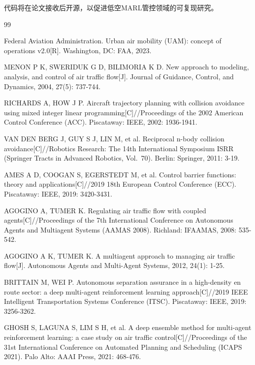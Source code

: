 \documentclass[12pt,a4paper,UTF8]{ctexart}
\begin{document}
代码将在论文接收后开源，以促进低空MARL管控领域的可复现研究。

\begin{thebibliography}{99}

 Federal Aviation Administration. Urban air mobility (UAM): concept of operations v2.0[R]. Washington, DC: FAA, 2023.

 MENON P K, SWERIDUK G D, BILIMORIA K D. New approach to modeling, analysis, and control of air traffic flow[J]. Journal of Guidance, Control, and Dynamics, 2004, 27(5): 737-744.

 RICHARDS A, HOW J P. Aircraft trajectory planning with collision avoidance using mixed integer linear programming[C]//Proceedings of the 2002 American Control Conference (ACC). Piscataway: IEEE, 2002: 1936-1941.

 VAN DEN BERG J, GUY S J, LIN M, et al. Reciprocal n-body collision avoidance[C]//Robotics Research: The 14th International Symposium ISRR (Springer Tracts in Advanced Robotics, Vol.\ 70). Berlin: Springer, 2011: 3-19.

 AMES A D, COOGAN S, EGERSTEDT M, et al. Control barrier functions: theory and applications[C]//2019 18th European Control Conference (ECC). Piscataway: IEEE, 2019: 3420-3431.

 AGOGINO A, TUMER K. Regulating air traffic flow with coupled agents[C]//Proceedings of the 7th International Conference on Autonomous Agents and Multiagent Systems (AAMAS 2008). Richland: IFAAMAS, 2008: 535-542.

 AGOGINO A K, TUMER K. A multiagent approach to managing air traffic flow[J]. Autonomous Agents and Multi-Agent Systems, 2012, 24(1): 1-25.

 BRITTAIN M, WEI P. Autonomous separation assurance in a high-density en route sector: a deep multi-agent reinforcement learning approach[C]//2019 IEEE Intelligent Transportation Systems Conference (ITSC). Piscataway: IEEE, 2019: 3256-3262.

 GHOSH S, LAGUNA S, LIM S H, et al. A deep ensemble method for multi-agent reinforcement learning: a case study on air traffic control[C]//Proceedings of the 31st International Conference on Automated Planning and Scheduling (ICAPS 2021). Palo Alto: AAAI Press, 2021: 468-476.


\end{thebibliography}
\end{document}
